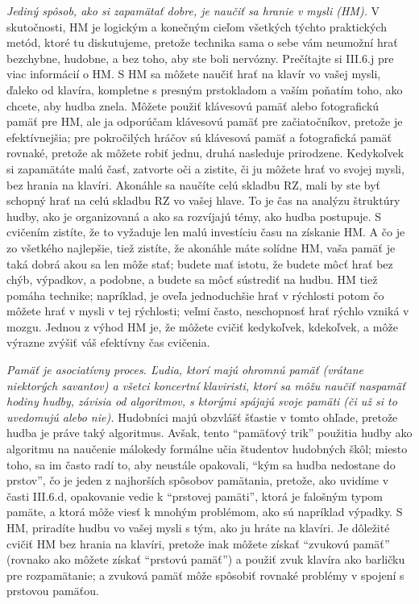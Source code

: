 \emph{Jediný spôsob, ako si zapamätať dobre, je naučiť sa hranie v mysli (HM).} V skutočnosti, HM je logickým a konečným cieľom všetkých týchto praktických metód, ktoré tu diskutujeme, pretože technika sama o sebe vám neumožní hrať bezchybne, hudobne, a bez toho, aby ste boli nervózny. Prečítajte si III.6.j pre viac informácií o HM. S HM sa môžete  naučiť hrať na klavír vo vašej mysli, ďaleko od klavíra, kompletne s presným prstokladom a vaším poňatím toho, ako chcete, aby hudba znela. Môžete použiť klávesovú pamäť alebo fotografickú pamäť pre HM, ale ja odporúčam klávesovú pamäť pre začiatočníkov, pretože je efektívnejšia; pre pokročilých hráčov sú klávesová pamäť a fotografická pamäť rovnaké, pretože ak môžete robiť jednu, druhá nasleduje prirodzene. Kedykoľvek si zapamätáte malú časť, zatvorte oči a zistite, či ju môžete hrať vo svojej mysli, bez hrania na klavíri. Akonáhle sa naučíte celú skladbu RZ, mali by ste byť schopný hrať na celú skladbu RZ vo vašej hlave. To je  čas na analýzu štruktúry hudby, ako je organizovaná a ako sa rozvíjajú témy, ako hudba postupuje. S cvičením zistíte, že to vyžaduje len malú investíciu času na získanie HM. A čo je zo všetkého najlepšie, tiež zistíte, že akonáhle máte solídne HM, vaša pamäť je taká dobrá akou sa len môže stať; budete mať istotu, že budete môcť hrať bez chýb, výpadkov, a podobne, a budete sa môcť sústrediť na hudbu. HM tiež pomáha technike; napríklad, je oveľa jednoduchšie hrať v rýchlosti potom čo môžete hrať v mysli v tej rýchlosti; veľmi často, neschopnosť hrať rýchlo vzniká v mozgu. Jednou z výhod HM je, že môžete cvičiť kedykoľvek, kdekoľvek, a môže výrazne zvýšiť váš efektívny čas cvičenia.

\emph{Pamäť je asociatívny proces. Ľudia, ktorí majú ohromnú pamäť (vrátane niektorých savantov) a všetci koncertní klaviristi, ktorí sa môžu naučiť naspamäť hodiny hudby, závisia od algoritmov, s ktorými spájajú svoje pamäti (či už si to uvedomujú alebo nie).} Hudobníci majú obzvlášť šťastie v tomto ohľade, pretože hudba je práve taký algoritmus. Avšak, tento “pamäťový trik” použitia hudby ako algoritmu na naučenie málokedy formálne učia študentov hudobných škôl; miesto toho, sa im často radí to, aby neustále opakovali, “kým sa hudba nedostane do prstov”, čo je jeden z najhorších spôsobov pamätania, pretože, ako uvidíme v časti III.6.d, opakovanie vedie k “prstovej pamäti”, ktorá je falošným typom pamäte, a ktorá môže viesť k mnohým problémom, ako sú napríklad výpadky. S HM, priradíte hudbu vo vašej mysli s tým, ako ju hráte na klavíri. Je dôležité cvičiť HM bez hrania na klavíri, pretože inak môžete získať “zvukovú pamäť” (rovnako ako môžete získať “prstovú pamäť”) a použiť zvuk klavíra ako barličku pre rozpamätanie; a zvuková pamäť môže spôsobiť rovnaké problémy v spojení s prstovou pamäťou.

